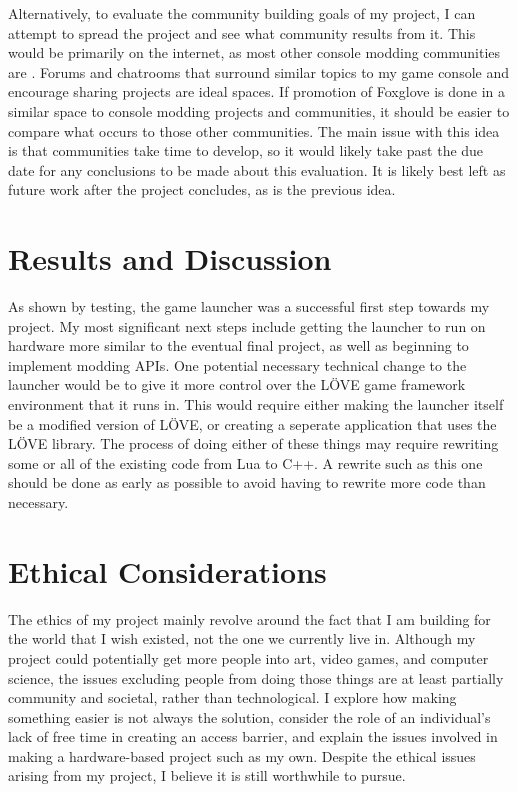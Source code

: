 \documentclass[10pt,twocolumn]{article}
\begin{document}
Alternatively, to evaluate the community building goals of my project, I can
attempt to spread the project and see what community results from it. This would
be primarily on the internet, as most other console modding communities are
\cite{brown_why_2022}. Forums and chatrooms that surround similar topics to my
game console and encourage sharing projects are ideal spaces. If promotion of
Foxglove is done in a similar space to console modding projects and
communities, it should be easier to compare what occurs to those other
communities. The main issue with this idea is that communities take time to
develop, so it would likely take past the due date for any conclusions to be
made about this evaluation. It is likely best left as future work after the
project concludes, as is the previous idea.

\section{Results and Discussion}

As shown by testing, the game launcher was a successful first step towards my
project. My most significant next steps include getting the launcher to run on
hardware more similar to the eventual final project, as well as beginning to
implement modding APIs. One potential necessary technical change to the launcher
would be to give it more control over the LÖVE
game framework environment that
it runs in. This would require either making the launcher itself be a modified
version of
LÖVE, or creating a seperate application that uses the LÖVE
library.
The process of doing either of these things may require rewriting some or all of
the existing code from Lua to C++. A rewrite such as this one should be done as
early as possible to avoid having to rewrite more code than necessary.

\section{Ethical Considerations}

The ethics of my project mainly revolve around the fact that I am building
for the world that I wish existed, not the one we currently live in. Although my
project could potentially get more people into art, video games, and computer
science, the issues excluding people from doing those things are at least
partially community and societal, rather than technological.
I explore how making
something easier is not always the solution, consider the role of an
individual's lack of free time in creating an access barrier, and explain the
issues involved in making a hardware-based project such as my own. Despite the
ethical issues arising from my project, I believe it is still worthwhile to
pursue.
\end{document}
